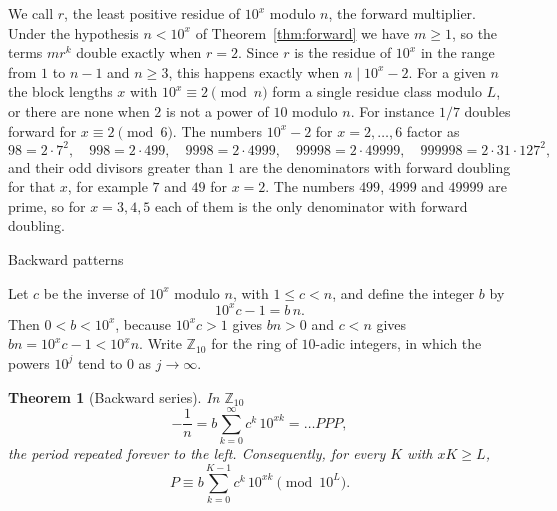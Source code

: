 \documentclass[11pt,a4paper]{amsart}
\makeatletter
\def\section{\@startsection{section}{1}%
  \z@{-.7\linespacing\@plus-\linespacing}{.5\linespacing}%
  {\normalfont\scshape\centering}}
\newtheorem{theorem}{Theorem}
\theoremstyle{definition}
\theoremstyle{remark}
\newcommand{\Ztena}{\mathbb{Z}_{10}}
\makeatother
\begin{document}
We call $r$, the least positive residue of $10^x$ modulo $n$, the forward multiplier. Under the hypothesis $n < 10^x$ of Theorem~\ref{thm:forward} we have $m \ge 1$, so the terms $m r^k$ double exactly when $r = 2$. Since $r$ is the residue of $10^x$ in the range from $1$ to $n - 1$ and $n \ge 3$, this happens exactly when $n \mid 10^x - 2$. For a given $n$ the block lengths $x$ with
$10^x \equiv 2 \pmod n$ form a single residue class modulo $L$, or there are
none when $2$ is not a power of $10$ modulo $n$. For instance $1/7$ doubles
forward for $x \equiv 2 \pmod 6$. The numbers $10^x - 2$ for $x = 2, \dots, 6$
factor as
\[
98 = 2\cdot 7^2,\quad 998 = 2\cdot 499,\quad 9998 = 2\cdot 4999,\quad
99998 = 2\cdot 49999,\quad
999998 = 2\cdot 31\cdot 127^2 ,
\]
and their odd divisors greater than $1$ are the denominators with forward doubling for that $x$, for example $7$ and $49$ for $x = 2$. The numbers $499$, $4999$ and $49999$ are prime, so for $x = 3, 4, 5$ each of them is the only denominator with forward doubling.

\section{Backward patterns}

Let $c$ be the inverse of $10^x$ modulo $n$, with $1 \le c < n$, and define the
integer $b$ by
\begin{equation}\label{eq:b}
10^x c - 1 = b\,n .
\end{equation}
Then $0 < b < 10^x$, because $10^x c > 1$ gives $bn > 0$ and $c < n$ gives $bn = 10^x c - 1 < 10^x n$. Write $\Ztena$ for the ring of $10$-adic
integers, in which the powers $10^j$ tend to $0$ as $j \to \infty$.

\begin{theorem}[Backward series]\label{thm:backward}
In $\Ztena$
\begin{equation}\label{eq:backward}
-\frac1n = b \sum_{k=0}^{\infty} c^k\, 10^{xk} = \dots PPP ,
\end{equation}
the period repeated forever to the left. Consequently, for every $K$ with
$xK \ge L$,
\begin{equation}\label{eq:congruence}
P \equiv b \sum_{k=0}^{K-1} c^k\, 10^{xk} \pmod{10^L}.
\end{equation}
\end{theorem}
\end{document}
